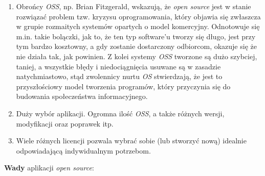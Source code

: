\documentclass{article}
\begin{document}
\begin{enumerate}
    \item Obrońcy \emph{OSS}, np. Brian Fitzgerald, wskazują, że \emph{open source} jest w stanie rozwiązać problem tzw. kryzysu oprogramowania, który objawia się zwłaszcza w grupie rozmaitych systemów opartych o model komercyjny. Odnotowuje się m.in. takie bolączki, jak to, że ten typ software'u tworzy się długo, jest przy tym bardzo kosztowny, a gdy zostanie dostarczony odbiorcom, okazuje się że nie działa tak, jak powinien. Z kolei systemy \emph{OSS} tworzone są dużo szybciej, taniej, a wszystkie błędy i niedociągnięcia usuwane są w zasadzie natychmiastowo, stąd zwolennicy nurtu \emph{OS} stwierdzają, że jest to przyszłościowy model tworzenia programów, który przyczynia się do budowania społeczeństwa informacyjnego\cite{Kotula}.
    
    \item Duży wybór aplikacji. Ogromna ilość \emph{OSS}, a także różnych wersji, modyfikacji oraz poprawek itp\cite{Kotula}.
    
    \item Wiele różnych licencji pozwala wybrać sobie (lub stworzyć nową) idealnie odpowiadającą indywidualnym potrzebom\cite{Kotula}. 
\end{enumerate}

\textbf{Wady} aplikacji \emph{open source}:
\end{document}
